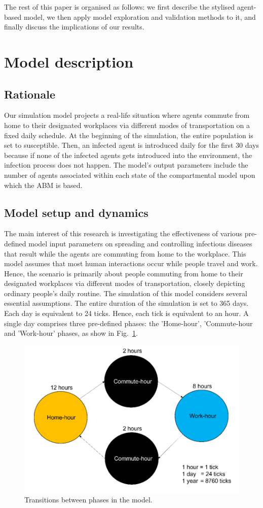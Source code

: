 \documentclass[smallextended]{svjour3}       %
\begin{document}
The rest of this paper is organised as follows: we first describe the stylised agent-based model, we then apply model exploration and validation methods to it, and finally discuss the implications of our results.




\section{Model description}


\subsection{Rationale}

Our simulation model projects a real-life situation where agents commute from home to their designated workplaces via different modes of transportation on a fixed daily schedule. At the beginning of the simulation, the entire population is set to susceptible. Then, an infected agent is introduced daily for the first 30 days because if none of the infected agents gets introduced into the environment, the infection process does not happen. The model's output parameters include the number of agents associated within each state of the compartmental model upon which the ABM is based.


\subsection{Model setup and dynamics}

The main interest of this research is investigating the effectiveness of various pre-defined model input parameters on spreading and controlling infectious diseases that result while the agents are commuting from home to the workplace. This model assumes that most human interactions occur while people travel and work. Hence, the scenario is primarily about people commuting from home to their designated workplaces via different modes of transportation, closely depicting ordinary people's daily routine. The simulation of this model considers several essential assumptions. The entire duration of the simulation is set to 365 days. Each day is equivalent to 24 ticks. Hence, each tick is equivalent to an hour. A single day comprises three pre-defined phases: the 'Home-hour', 'Commute-hour and 'Work-hour' phases, as show in Fig.~\ref{fig:modeltrans}.

\begin{figure}
	\centering
	\includegraphics[width=0.5\linewidth]{figures/ModelTransitions.png}
	\caption{Transitions between phases in the model.\label{fig:modeltrans}}
\end{figure}
\end{document}
